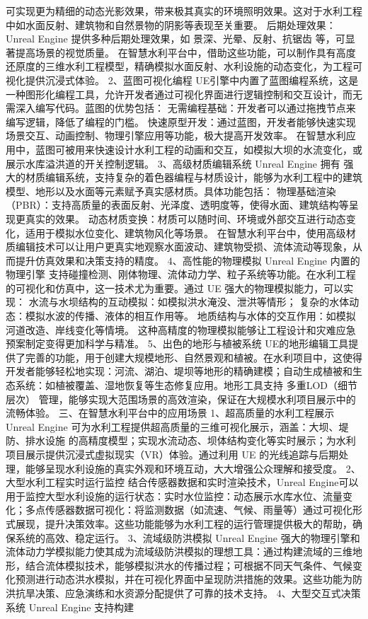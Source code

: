 {{{可实现更为精细的动态光影效果，带来极其真实的环境照明效果。这对于水利工程中如水面反射、建筑物和自然景物的阴影等表现至关重要。 后期处理效果：Unreal Engine 提供多种后期处理效果，如 景深、光晕、反射、抗锯齿 等，可显著提高场景的视觉质量。 在智慧水利平台中，借助这些功能，可以制作具有高度还原度的三维水利工程模型，精确模拟水面反射、水利设施的动态变化，为工程可视化提供沉浸式体验。 2、蓝图可视化编程 UE引擎中内置了蓝图编程系统，这是一种图形化编程工具，允许开发者通过可视化界面进行逻辑控制和交互设计，而无需深入编写代码。蓝图的优势包括： 无需编程基础：开发者可以通过拖拽节点来编写逻辑，降低了编程的门槛。 快速原型开发：通过蓝图，开发者能够快速实现场景交互、动画控制、物理引擎应用等功能，极大提高开发效率。 在智慧水利应用中，蓝图可被用来快速设计水利工程的动画和交互，如模拟大坝的水流变化，或展示水库溢洪道的开关控制逻辑。 3、高级材质编辑系统 Unreal Engine 拥有 强大的材质编辑系统，支持复杂的着色器编程与材质设计，能够为水利工程中的建筑模型、地形以及水面等元素赋予真实感材质。具体功能包括： 物理基础渲染（PBR）：支持高质量的表面反射、光泽度、透明度等，使得水面、建筑结构等呈现更真实的效果。 动态材质变换：材质可以随时间、环境或外部交互进行动态变化，适用于模拟水位变化、建筑物风化等场景。 在智慧水利平台中，使用高级材质编辑技术可以让用户更真实地观察水面波动、建筑物受损、流体流动等现象，从而提升仿真效果和决策支持的精度。 4、高性能的物理模拟 Unreal Engine 内置的 物理引擎 支持碰撞检测、刚体物理、流体动力学、粒子系统等功能。在水利工程的可视化和仿真中，这一技术尤为重要。通过 UE 强大的物理模拟能力，可以实现： 水流与水坝结构的互动模拟：如模拟洪水淹没、泄洪等情形； 复杂的水体动态：模拟水波的传播、液体的相互作用等。 地质结构与水体的交互作用：如模拟河道改造、岸线变化等情境。 这种高精度的物理模拟能够让工程设计和灾难应急预案制定变得更加科学与精准。 5、出色的地形与植被系统 UE的地形编辑工具提供了完善的功能，用于创建大规模地形、自然景观和植被。在水利项目中，这使得开发者能够轻松地实现：河流、湖泊、堤坝等地形的精确建模；自动生成植被和生态系统：如植被覆盖、湿地恢复等生态修复应用。地形工具支持 多重LOD（细节层次） 管理，能够实现大范围场景的高效渲染，保证在大规模水利项目展示中的流畅体验。 三、在智慧水利平台中的应用场景 1、超高质量的水利工程展示 Unreal Engine 可为水利工程提供超高质量的三维可视化展示，涵盖：大坝、堤防、排水设施 的高精度模型；实现水流动态、坝体结构变化等实时展示；为水利项目展示提供沉浸式虚拟现实（VR）体验。通过利用 UE 的光线追踪与后期处理，能够呈现水利设施的真实外观和环境互动，大大增强公众理解和接受度。 2、大型水利工程实时运行监控 结合传感器数据和实时渲染技术，Unreal Engine可以用于监控大型水利设施的运行状态：实时水位监控：动态展示水库水位、流量变化；多点传感器数据可视化：将监测数据（如流速、气候、雨量等）通过可视化形式展现，提升决策效率。这些功能能够为水利工程的运行管理提供极大的帮助，确保系统的高效、稳定运行。 3、流域级防洪模拟 Unreal Engine 强大的物理引擎和流体动力学模拟能力使其成为流域级防洪模拟的理想工具：通过构建流域的三维地形，结合流体模拟技术，能够模拟洪水的传播过程；可根据不同天气条件、气候变化预测进行动态洪水模拟，并在可视化界面中呈现防洪措施的效果。这些功能为防洪抗旱决策、应急演练和水资源分配提供了可靠的技术支持。 4、大型交互式决策系统 Unreal Engine 支持构建 }}}
